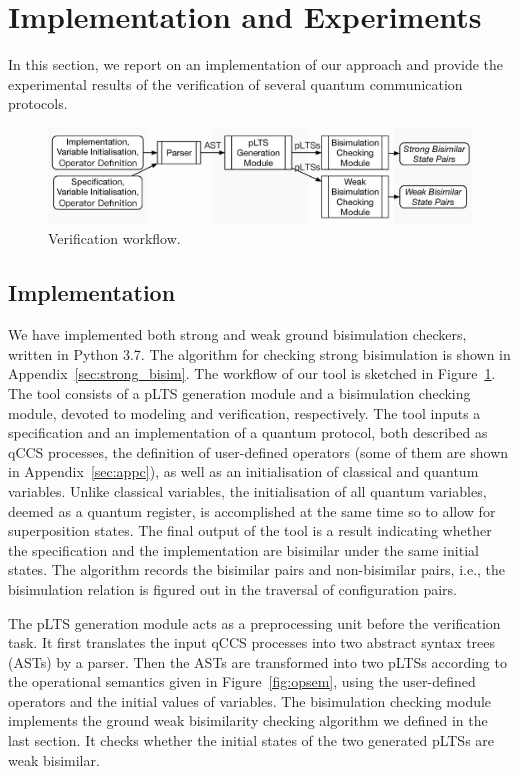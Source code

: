 \documentclass[a4paper,runningheads]{llncs}
\begin{document}
\section{Implementation and Experiments}
\label{sec:experiment}
In this section, we report on an implementation of our approach and provide the experimental results of the verification of several quantum communication protocols. 

\begin{figure}[htbp]
\centering
\includegraphics[width=\textwidth]{images/architecture.eps}
\caption{Verification workflow.}
\label{fig:arch}
\end{figure}

\subsection{Implementation}
We have implemented both strong and weak ground bisimulation checkers, written in Python 3.7. The algorithm for checking strong bisimulation is shown in Appendix~\ref{sec:strong_bisim}. The workflow of our tool is sketched in Figure~\ref{fig:arch}. The tool consists of a pLTS generation module and a bisimulation checking module, devoted to modeling and verification, respectively.
The tool inputs a specification and an implementation of a quantum protocol, both described as qCCS processes, the definition of user-defined operators (some of them are shown in  Appendix~\ref{sec:appc}), as well as an initialisation of classical and quantum variables. Unlike classical variables, the initialisation of all quantum variables, deemed as a quantum register, is accomplished at the same time so to allow for superposition states.
The final output of the tool is a result indicating whether the specification and the implementation are bisimilar under the same initial states. The algorithm records the bisimilar pairs and non-bisimilar pairs, i.e., the bisimulation relation is figured out in the traversal of configuration pairs.
%

The pLTS generation module acts as a preprocessing unit before the verification task. It first translates the input qCCS processes  into two abstract syntax trees (ASTs) by a parser. Then the ASTs are transformed into two pLTSs according to the operational semantics given in Figure~\ref{fig:opsem}, using the user-defined operators and the initial values of variables.
%
The bisimulation checking module implements the ground weak bisimilarity checking algorithm we defined in the last section. It checks whether the initial states of the two generated pLTSs are weak bisimilar. 
\end{document}
